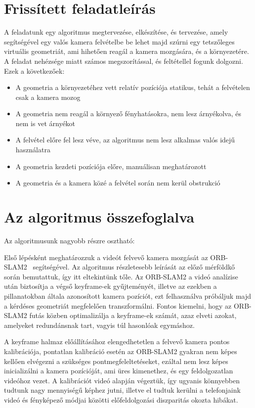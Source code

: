 \section{Frissített feladatleírás}

A feladatunk egy algoritmus megtervezése, elkészítése, és tervezése, amely segítségével egy valós kamera felvételbe be lehet majd szúrni egy tetszőleges virtuális geometriát, ami hihetően reagál a kamera mozgására, és a környezetére.
A feladat nehézsége miatt számos megszorítással, és feltétellel fogunk dolgozni.
Ezek a következőek:

\begin{itemize}
	\item A geometria a környezetéhez vett relatív pozíciója statikus, tehát a felvételen csak a kamera mozog
	\item A geometria nem reagál a környező fényhatásokra, nem lesz árnyékolva, és nem is vet árnyékot
	\item A felvétel előre fel lesz véve, az algoritmus nem lesz alkalmas valós idejű használatra
	\item A geometria kezdeti pozíciója előre, manuálisan meghatározott
	\item A geometria és a kamera közé a felvétel során nem kerül obstrukció
\end{itemize}

\section{Az algoritmus összefoglalva}

Az algoritmusunk nagyobb részre osztható:

Első lépésként meghatározzuk a videót felvevő kamera mozgását az ORB-SLAM2~\cite{mur2015orb} segítségével.
Az algoritmus részletesebb leírását az előző mérföldkő során bemutattuk, így itt eltekintünk tőle.
Az ORB-SLAM2 a videó analízise után biztosítja a végső keyframe-ek gyűjteményét, illetve az ezekben a pillanatokban általa azonosított kamera pozíciót, ezt felhasználva próbáljuk majd a kérdéses geometriát megfelelően transzformálni.
Fontos kiemelni, hogy az ORB-SLAM2 futás közben optimalizálja a keyframe-ek számát, azaz elveti azokat, amelyeket redundánsnak tart, vagyis túl hasonlóak egymáshoz.

A keyframe halmaz előállításához elengedhetetlen a felvevő kamera pontos kalibrációja, pontatlan kalibráció esetén az ORB-SLAM2 gyakran nem képes kellően elvégezni a szükséges pontmegfeleltetéseket, ezáltal nem lesz képes inicializálni a kamera pozícióját, ami üres kimenethez, és egy feldolgozatlan videóhoz vezet.
A kalibrációt videó alapján végeztük, így ugyanis könnyebben tudtunk nagy mennyiségű képhez jutni, illetve el tudtuk kerülni a telefonjaink videó és fényképező módjai közötti előfeldolgozási diszparitás okozta hibákat.

